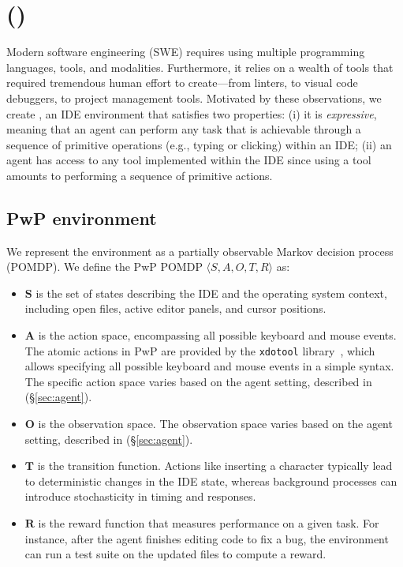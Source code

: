 \section{\Ours (\ours)}
\label{sec:methodology}
Modern software engineering (SWE) requires using multiple programming languages, tools, and modalities.
Furthermore, it relies on a wealth of tools that required tremendous human effort to create—from linters, to visual code debuggers, to project management tools.
Motivated by these observations, we create \Ours{}, an IDE environment that satisfies two properties: (i) it is \textit{expressive}, meaning that an agent can perform any task that is achievable through a sequence of primitive operations (e.g., typing or clicking) within an IDE; (ii) an agent has access to any tool implemented within the IDE since using a tool amounts to performing a sequence of primitive actions.



\subsection{PwP environment}

We represent the \ours{} environment as a partially observable Markov decision process (POMDP).
We define the PwP POMDP  \(\langle S, A, O, T, R \rangle\) as:

\begin{itemize}[leftmargin=2em]
\item \(\mathbf{S}\) is the set of states describing the IDE and the operating system context, including open files, active editor panels, and cursor positions. 
\item \(\mathbf{A}\) is the action space, encompassing all possible keyboard and mouse events.
The atomic actions in PwP are provided by the  \texttt{xdotool} library~\cite{xdotool}, which allows specifying all possible keyboard and mouse events in a simple syntax.
The specific action space varies based on the agent setting, described in (\S\ref{sec:agent}).

\item \(\mathbf{O}\) is the observation space.
The observation space varies based on the agent setting, described in (\S\ref{sec:agent}).
\item \(\mathbf{T}\) is the transition function.
Actions like inserting a character typically lead to deterministic changes in the IDE state, whereas background processes 
can introduce stochasticity in timing and responses. 
\item \(\mathbf{R}\) is the reward function that measures performance on a given task. 
For instance, after the agent finishes editing code to fix a bug, the environment can run a test suite on the updated files to compute a reward. 
\end{itemize}

